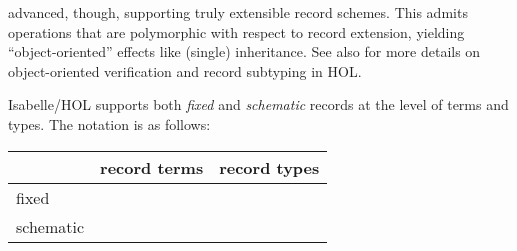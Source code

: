 \begin{isabellebody}
\begin{isamarkuptext}
  advanced, though, supporting truly extensible record schemes.  This
  admits operations that are polymorphic with respect to record
  extension, yielding ``object-oriented'' effects like (single)
  inheritance.  See also \cite{NaraschewskiW-TPHOLs98} for more
  details on object-oriented verification and record subtyping in HOL.%
\end{isamarkuptext}%
\isamarkuptrue%
%
\isamarkuptrue%
%
\begin{isamarkuptext}%
Isabelle/HOL supports both \emph{fixed} and \emph{schematic} records
  at the level of terms and types.  The notation is as follows:

  \begin{center}
  \begin{tabular}{l|l|l}
    & record terms & record types \\ \hline
    fixed & \isa{{\isaliteral{22}{\isachardoublequote}}{\isaliteral{5C3C6C706172723E}{\isasymlparr}}x\ {\isaliteral{3D}{\isacharequal}}\ a{\isaliteral{2C}{\isacharcomma}}\ y\ {\isaliteral{3D}{\isacharequal}}\ b{\isaliteral{5C3C72706172723E}{\isasymrparr}}{\isaliteral{22}{\isachardoublequote}}} & \isa{{\isaliteral{22}{\isachardoublequote}}{\isaliteral{5C3C6C706172723E}{\isasymlparr}}x\ {\isaliteral{3A}{\isacharcolon}}{\isaliteral{3A}{\isacharcolon}}\ A{\isaliteral{2C}{\isacharcomma}}\ y\ {\isaliteral{3A}{\isacharcolon}}{\isaliteral{3A}{\isacharcolon}}\ B{\isaliteral{5C3C72706172723E}{\isasymrparr}}{\isaliteral{22}{\isachardoublequote}}} \\
    schematic & \isa{{\isaliteral{22}{\isachardoublequote}}{\isaliteral{5C3C6C706172723E}{\isasymlparr}}x\ {\isaliteral{3D}{\isacharequal}}\ a{\isaliteral{2C}{\isacharcomma}}\ y\ {\isaliteral{3D}{\isacharequal}}\ b{\isaliteral{2C}{\isacharcomma}}\ {\isaliteral{5C3C646F74733E}{\isasymdots}}\ {\isaliteral{3D}{\isacharequal}}\ m{\isaliteral{5C3C72706172723E}{\isasymrparr}}{\isaliteral{22}{\isachardoublequote}}} &
      \isa{{\isaliteral{22}{\isachardoublequote}}{\isaliteral{5C3C6C706172723E}{\isasymlparr}}x\ {\isaliteral{3A}{\isacharcolon}}{\isaliteral{3A}{\isacharcolon}}\ A{\isaliteral{2C}{\isacharcomma}}\ y\ {\isaliteral{3A}{\isacharcolon}}{\isaliteral{3A}{\isacharcolon}}\ B{\isaliteral{2C}{\isacharcomma}}\ {\isaliteral{5C3C646F74733E}{\isasymdots}}\ {\isaliteral{3A}{\isacharcolon}}{\isaliteral{3A}{\isacharcolon}}\ M{\isaliteral{5C3C72706172723E}{\isasymrparr}}{\isaliteral{22}{\isachardoublequote}}} \\
  \end{tabular}
  \end{center}


\end{isamarkuptext}
\end{isabellebody}
